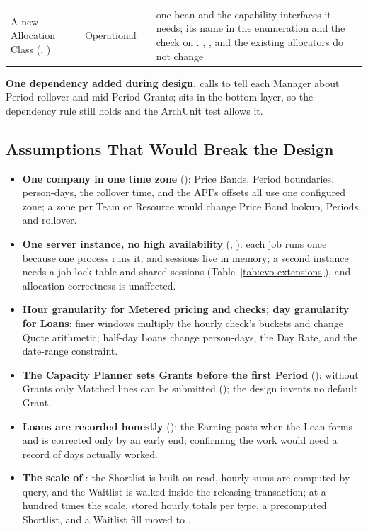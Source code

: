 {\begin{longtable}{@{}L{0.27\textwidth}L{0.08\textwidth}L{0.17\textwidth}L{\tabcolsep\relax}@{}}
A new Allocation Class (, ) & Oper\-ational &  & one  bean and the capability interfaces it needs; its name in the  enumeration and the check on . , , and the existing allocators do not change \\
\end{longtable}
}

\textbf{One dependency added during design.}  calls  to tell each Manager about Period rollover and mid-Period Grants;  sits in the bottom layer, so the dependency rule still holds and the ArchUnit test allows it.

\subsection{Assumptions That Would Break the Design}

\begin{itemize}
  \item \textbf{One company in one time zone} (): Price Bands, Period boundaries, person-days, the rollover time, and the API's offsets all use one configured zone; a zone per Team or Resource would change Price Band lookup, Periods, and rollover.
  \item \textbf{One server instance, no high availability} (, ): each job runs once because one process runs it, and sessions live in memory; a second instance needs a job lock table and shared sessions (Table~\ref{tab:evo-extensions}), and allocation correctness is unaffected.
  \item \textbf{Hour granularity for Metered pricing and checks; day granularity for Loans}: finer windows multiply the hourly check's buckets and change Quote arithmetic; half-day Loans change person-days, the Day Rate, and the date-range constraint.
  \item \textbf{The Capacity Planner sets Grants before the first Period} (): without Grants only Matched lines can be submitted (); the design invents no default Grant.
  \item \textbf{Loans are recorded honestly} (): the Earning posts when the Loan forms and is corrected only by an early end; confirming the work would need a record of days actually worked.
  \item \textbf{The scale of }: the Shortlist is built on read, hourly sums are computed by query, and the Waitlist is walked inside the releasing transaction; at a hundred times the scale, stored hourly totals per type, a precomputed Shortlist, and a Waitlist fill moved to .
\end{itemize}

